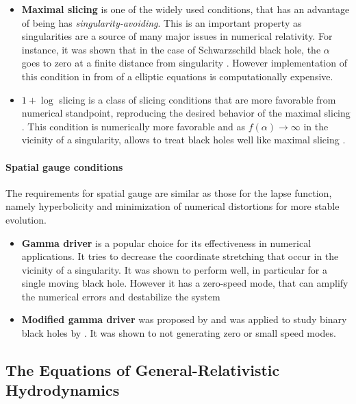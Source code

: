 \documentclass[11pt,a4paper,headinclude=true,DIV=14,BCOR=8mm,chapterprefix,listof=totoc,twoside,openright,abstracton]{scrbook}
\begin{document}
\begin{itemize}
    \item \textbf{Maximal slicing} is one of the widely used conditions, that has an advantage of being has \textit{singularity-avoiding}. This is an important property as singularities are a source of many major issues in numerical relativity. For instance, it was shown that in the case of Schwarzschild black hole, the $\alpha$ goes to zero at a finite distance from singularity \cite{Geyer:1995}. However implementation of this condition in from of a elliptic equations is computationally expensive.
    \item \textbf{$1+\log$} slicing is a class of slicing conditions that are more favorable from numerical standpoint, reproducing the desired behavior of the maximal slicing \cite{Bona:1994dr}. This condition is numerically more favorable and as $f(\alpha)\rightarrow\infty$ in the vicinity of a singularity, allows to treat black holes well like maximal slicing \cite{Baumgarte:2002jm}. 
\end{itemize}

\paragraph{Spatial gauge conditions}

The requirements for spatial gauge are similar as those for the lapse function, namely hyperbolicity and minimization of numerical distortions for more stable evolution.

\begin{itemize}
    \item \textbf{Gamma driver} \cite{Alcubierre:2002kk} is a popular choice for its effectiveness in numerical applications. It tries to decrease the coordinate stretching that occur in the vicinity of a singularity. It was shown to perform well, in particular for a single moving black hole. However it has a zero-speed mode, that can amplify the numerical errors and destabilize the system \cite{vanMeter:2006vi}
    \item \textbf{Modified gamma driver} was proposed by \cite{vanMeter:2006vi} and was applied to study binary black holes by \cite{Campanelli:2005dd}. It was shown to not generating zero or small speed modes.
\end{itemize}



\subsection{The Equations of General-Relativistic Hydrodynamics}
\end{document}

